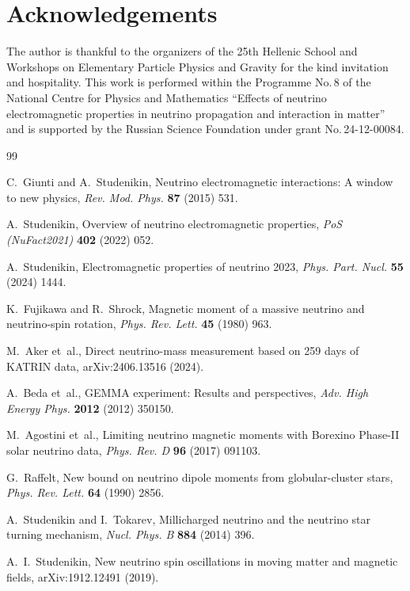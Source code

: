 \documentclass[a4paper,11pt]{article}
\begin{document}
\section*{Acknowledgements}

The author is thankful to the organizers of the 25th Hellenic School and Workshops on Elementary Particle Physics and Gravity for the kind invitation and hospitality. This work is performed within the Programme No.\,8 of the National Centre for Physics and Mathematics ``Effects of neutrino electromagnetic properties in neutrino propagation and interaction in matter'' and is supported by the Russian Science Foundation under grant No.\,24-12-00084.

\begin{thebibliography}{99}

C.~Giunti and A.~Studenikin,
Neutrino electromagnetic interactions: A window to new physics,
{\em Rev. Mod. Phys.} {\bf 87} (2015) 531.

A.~Studenikin,
Overview of neutrino electromagnetic properties,
{\em PoS (NuFact2021)} {\bf 402} (2022) 052.

A.~Studenikin,
Electromagnetic properties of neutrino 2023,
{\em Phys. Part. Nucl.} {\bf 55} (2024) 1444.

K.~Fujikawa and R.~Shrock,
Magnetic moment of a massive neutrino and neutrino-spin rotation,
{\em Phys. Rev. Lett.} {\bf 45} (1980) 963.

M.~Aker et~al.,
Direct neutrino-mass measurement based on 259 days of KATRIN data,
arXiv:2406.13516 (2024).

A.~Beda et~al.,
GEMMA experiment: Results and perspectives,
{\em Adv. High Energy Phys.} {\bf 2012} (2012) 350150.

M.~Agostini et~al.,
Limiting neutrino magnetic moments with Borexino Phase-II solar neutrino data,
{\em Phys. Rev. D} {\bf 96} (2017) 091103.

G.~Raffelt,
New bound on neutrino dipole moments from globular-cluster stars,
{\em Phys. Rev. Lett.} {\bf 64} (1990) 2856.

A.~Studenikin and I.~Tokarev,
Millicharged neutrino and the neutrino star turning mechanism,
{\em Nucl. Phys. B} {\bf 884} (2014) 396.

A.~I.~Studenikin,
New neutrino spin oscillations in moving matter and magnetic fields,
arXiv:1912.12491 (2019).


\end{thebibliography}
\end{document}
